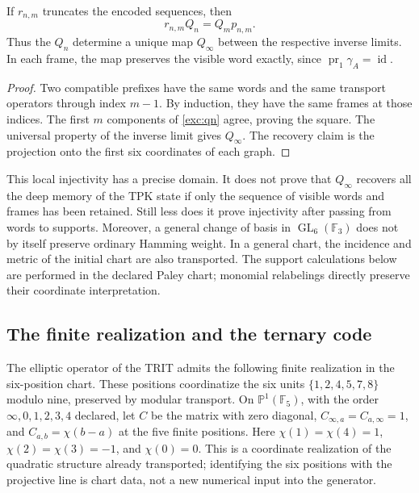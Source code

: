 \begin{proposition}
\label{exc:limite-inverso}
If $r_{n,m}$ truncates the encoded sequences, then
\[
 r_{n,m}Q_n=Q_m p_{n,m}.
\]
Thus the $Q_n$ determine a unique map $Q_\infty$ between the
respective inverse limits. In each frame, the map preserves the visible word
exactly, since $\operatorname{pr}_1\gamma_A=\operatorname{id}$.
\end{proposition}

\begin{proof}
Two compatible prefixes have the same words and the same
transport operators through index $m-1$. By induction, they have
the same frames at those indices. The first $m$ components of
\eqref{exc:qn} agree, proving the square. The universal
property of the inverse limit gives $Q_\infty$. The recovery claim
is the projection onto the first six coordinates of each graph.
\end{proof}

This local injectivity has a precise domain. It does not prove that
$Q_\infty$ recovers all the deep memory of the TPK state if only
the sequence of visible words and frames has been retained. Still less
does it prove injectivity after passing from words to supports.
Moreover, a general change of basis in $\operatorname{GL}_6(\mathbb F_3)$
does not by itself preserve ordinary Hamming weight. In a general
chart, the incidence and metric of the initial chart are also
transported. The support calculations below are performed in the
declared Paley chart; monomial relabelings directly preserve their
coordinate interpretation.

\subsection{The finite realization and the ternary code}
\label{exc:paley-codigo}

The elliptic operator of the TRIT admits the following finite realization in
the six-position chart. These positions coordinatize the six units
$\{1,2,4,5,7,8\}$ modulo nine, preserved by modular transport.
On $\mathbb P^1(\mathbb F_5)$, with
the order $\infty,0,1,2,3,4$ declared, let $C$ be the matrix with zero
diagonal, $C_{\infty,a}=C_{a,\infty}=1$, and
$C_{a,b}=\chi(b-a)$ at the five finite positions. Here
$\chi(1)=\chi(4)=1$, $\chi(2)=\chi(3)=-1$, and $\chi(0)=0$.
This is a coordinate realization of the quadratic structure already
transported; identifying the six positions with the projective
line is chart data, not a new numerical input into the
generator.

